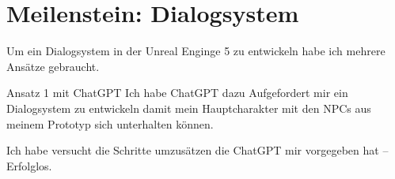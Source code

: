 \section {Meilenstein: Dialogsystem}
Um ein Dialogsystem in der Unreal Enginge 5 zu entwickeln habe ich mehrere Ansätze gebraucht.
 
Ansatz 1 mit ChatGPT
Ich habe ChatGPT dazu Aufgefordert mir ein Dialogsystem zu entwickeln damit mein Hauptcharakter mit den NPCs aus meinem Prototyp sich unterhalten können.
 
Ich habe versucht die Schritte umzusätzen die ChatGPT mir vorgegeben hat – Erfolglos.
 
